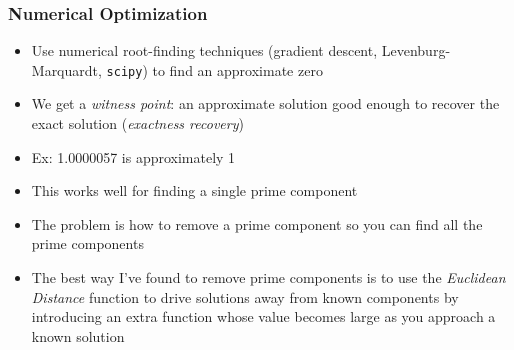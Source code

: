 \documentclass{beamer}
\begin{document}

\begin{frame}
\frametitle{Numerical Optimization}
\begin{itemize}
\item Use numerical root-finding techniques (gradient descent, Levenburg-Marquardt, {\tt scipy}) to find an approximate zero
\item We get a {\it witness point}: an approximate solution good enough to recover the exact solution ({\it exactness recovery})
\item Ex: 1.0000057 is approximately 1
\item This works well for finding a single prime component
\item The problem is how to remove a prime component so you can find all the prime components
\item The best way I've found to remove prime components is to use the {\it Euclidean Distance} function
to drive solutions away from known components by introducing an extra function whose value becomes large
as you approach a known solution
\end{itemize}
\end{frame}
\end{document}
